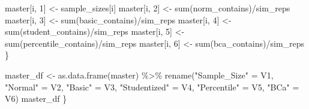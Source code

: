 \documentclass[12pt]{article}
\newenvironment{Shaded}{\begin{snugshade}}{\end{snugshade}}
\newcommand{\DecValTok}[1]{\textcolor[rgb]{0.00,0.00,0.81}{#1}}
\newcommand{\FunctionTok}[1]{\textcolor[rgb]{0.00,0.00,0.00}{#1}}
\newcommand{\NormalTok}[1]{#1}
\newcommand{\OtherTok}[1]{\textcolor[rgb]{0.56,0.35,0.01}{#1}}
\newcommand{\SpecialCharTok}[1]{\textcolor[rgb]{0.00,0.00,0.00}{#1}}
\newcommand{\StringTok}[1]{\textcolor[rgb]{0.31,0.60,0.02}{#1}}
\begin{document}
\begin{Shaded}
\begin{Highlighting}[]
\NormalTok{    master[i, }\DecValTok{1}\NormalTok{] }\OtherTok{\textless{}{-}}\NormalTok{ sample\_sizes[i]}
\NormalTok{    master[i, }\DecValTok{2}\NormalTok{] }\OtherTok{\textless{}{-}} \FunctionTok{sum}\NormalTok{(norm\_contains)}\SpecialCharTok{/}\NormalTok{sim\_reps}
\NormalTok{    master[i, }\DecValTok{3}\NormalTok{] }\OtherTok{\textless{}{-}} \FunctionTok{sum}\NormalTok{(basic\_contains)}\SpecialCharTok{/}\NormalTok{sim\_reps}
\NormalTok{    master[i, }\DecValTok{4}\NormalTok{] }\OtherTok{\textless{}{-}} \FunctionTok{sum}\NormalTok{(student\_contains)}\SpecialCharTok{/}\NormalTok{sim\_reps}
\NormalTok{    master[i, }\DecValTok{5}\NormalTok{] }\OtherTok{\textless{}{-}} \FunctionTok{sum}\NormalTok{(percentile\_contains)}\SpecialCharTok{/}\NormalTok{sim\_reps}
\NormalTok{    master[i, }\DecValTok{6}\NormalTok{] }\OtherTok{\textless{}{-}} \FunctionTok{sum}\NormalTok{(bca\_contains)}\SpecialCharTok{/}\NormalTok{sim\_reps}
\NormalTok{  \}}
  
\NormalTok{  master\_df }\OtherTok{\textless{}{-}} \FunctionTok{as.data.frame}\NormalTok{(master) }\SpecialCharTok{\%\textgreater{}\%} 
      \FunctionTok{rename}\NormalTok{(}\StringTok{"Sample\_Size"} \OtherTok{=}\NormalTok{ V1, }\StringTok{"Normal"} \OtherTok{=}\NormalTok{ V2, }\StringTok{"Basic"} \OtherTok{=}\NormalTok{ V3, }\StringTok{"Studentized"} \OtherTok{=}\NormalTok{ V4, }
             \StringTok{"Percentile"} \OtherTok{=}\NormalTok{ V5, }\StringTok{"BCa"} \OtherTok{=}\NormalTok{ V6) }
\NormalTok{  master\_df}
\NormalTok{\}}
\end{Highlighting}
\end{Shaded}
\end{document}
